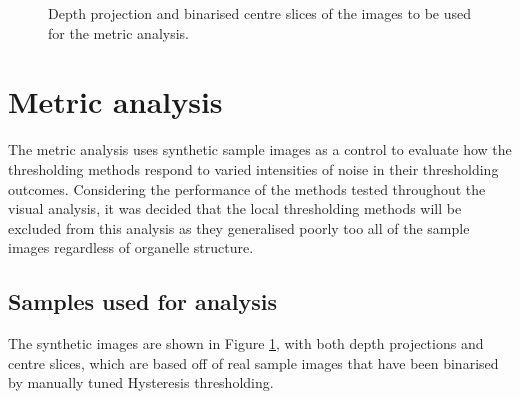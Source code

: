 \begin{figure}
	
	\caption{Depth projection and binarised centre slices of the images to be used for the metric analysis.}
	\label{fig:metric_raw}
\end{figure}

\section{Metric analysis}
The metric analysis uses synthetic sample images as a control to evaluate how the thresholding methods respond to varied intensities of noise in their thresholding outcomes. Considering the performance of the methods tested throughout the visual analysis, it was decided that the local thresholding methods will be excluded from this analysis as they generalised poorly too all of the sample images regardless of organelle structure.

\subsection{Samples used for analysis}
The synthetic images are shown in Figure \ref{fig:metric_raw}, with both depth projections and centre slices, which are based off of real sample images that have been binarised by manually tuned Hysteresis thresholding.

\FloatBarrier
